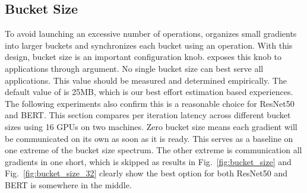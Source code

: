 

\subsection{Bucket Size}





To avoid launching an excessive number of  operations,  organizes small gradients into larger buckets and synchronizes each bucket using an  operation. With this design, bucket size is an important configuration knob.  exposes this knob to applications through  argument. No single bucket size can best serve all applications. This value should be measured and determined empirically. The default value of  is 25MB, which is our best effort estimation based experiences. The following experiments also confirm this is a reasonable choice for ResNet50 and BERT. This section compares per iteration latency across different bucket sizes using 16 GPUs on two machines. Zero bucket size means each gradient will be communicated on its own as soon as it is ready. This serves as a baseline on one extreme of the bucket size spectrum. The other extreme is communication all gradients in one short, which is skipped as results in Fig.~\ref{fig:bucket_size} and Fig.~\ref{fig:bucket_size_32} clearly show the best option for both ResNet50 and BERT is somewhere in the middle.


